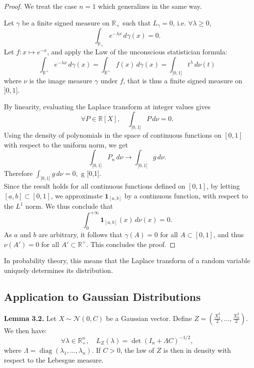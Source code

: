 \documentclass[12pt]{article}
\begin{document}
\begin{proof}
We treat the case $n = 1$ which generalizes in the same way.

Let $\gamma$ be a finite signed measure on $\mathbb{R}_+$ such that $L_\gamma = 0$, i.e. $\forall \lambda \geq 0$,
\[
\int_{\mathbb{R}_+} e^{-\lambda x} \, d\gamma(x) = 0.
\]
Let $f : x \mapsto e^{-x}$, and apply the Law of the unconscious statistician formula:
\[
\int_{\mathbb{R}^+} e^{-\lambda x} \, d\gamma(x) = \int_{\mathbb{R}^+} f(x) \, d\gamma(x) = \int_{]0,1]} t^\lambda \, d\nu(t)
\]
where $\nu$ is the image measure $\gamma$ under $f$, that is thus a finite signed measure on $]0,1]$.

By linearity, evaluating the Laplace transform at integer values gives
\[
\forall P \in \mathbb{R}[X], \quad \int_{]0,1]} P \, d\nu = 0.
\]
Using the density of polynomials in the space of continuous functions on $[0,1]$ with respect to the uniform norm, we get
\[
\int_{]0,1]} P_n \, d\nu \longrightarrow \int_{]0,1]} g \, d\nu.
\]
Therefore $\int_{]0,1]} g \, d\nu = 0,$  g  [0,1].\\
Since the result holds for all continuous functions defined on $[0,1]$, by letting $[a,b] \subset [0,1]$, we approximate $\mathbf{1}_{[a,b]}$ by a continuous function, with respect to the $L^1$ norm. We thus conclude that
\[
\int_{0}^{+\infty} \mathbf{1}_{[a,b]}(x) \, d\nu(x) = 0.
\]
As $a$ and $b$ are arbitrary, it follows that $\gamma(A) = 0$ for all $A \subset [0,1]$, and thus $\nu(A') = 0$ for all $A' \subset \mathbb{R}^+$. This concludes the proof.
\end{proof}

In probability theory, this means that the Laplace transform of a random variable uniquely determines its distribution.

\newpage

\subsection{Application to Gaussian Distributions}

\textbf{Lemma 3.2.}
Let $X \sim \mathcal{N}(0, C)$ be a Gaussian vector. Define $ Z = \left( \frac{X_1^2}{2}, \dots, \frac{X_n^2}{2} \right).
$
We then have:
\[
\forall \lambda \in \mathbb{R}_+^n, \quad L_Z(\lambda) = \det(I_n + \Lambda C)^{-1/2},
\]
where $\Lambda = \operatorname{diag}(\lambda_1, \dots, \lambda_n)$. If $C > 0$, the law of $Z$ is then in density with respect to the Lebesgue measure.
\end{document}
